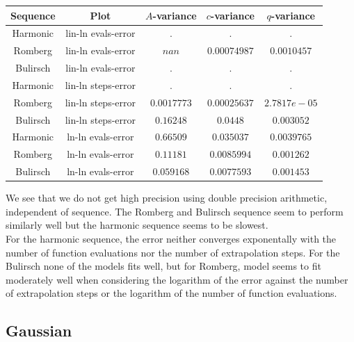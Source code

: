 \begin{table}[H]
    \centering
    \begin{tabular}{c|c||c|c|c}
Sequence & Plot & \(A\)-variance & \(c\)-variance & \(q\)-variance\\\hline
Harmonic & lin-ln evals-error & . & . & . \\
Romberg & lin-ln evals-error & \(nan\) & \(0.00074987\) & \(0.0010457\) \\
Bulirsch & lin-ln evals-error & . & . & . \\
Harmonic & lin-ln steps-error & . & . & . \\
Romberg & lin-ln steps-error & \(0.0017773\) & \(0.00025637\) & \(2.7817e-05\) \\
Bulirsch & lin-ln steps-error & \(0.16248\) & \(0.0448\) & \(0.003052\) \\
Harmonic & ln-ln evals-error & \(0.66509\) & \(0.035037\) & \(0.0039765\) \\
Romberg & ln-ln evals-error & \(0.11181\) & \(0.0085994\) & \(0.001262\) \\
Bulirsch & ln-ln evals-error & \(0.059168\) & \(0.0077593\) & \(0.001453\) \\
    \end{tabular}
    \label{tab:my_label}
\end{table}

We see that we do not get high precision using double precision arithmetic, independent of sequence. The Romberg and Bulirsch sequence seem to perform similarly well but the harmonic sequence seems to be slowest.\\

For the harmonic sequence, the error neither converges exponentally with the number of function evaluations nor the number of extrapolation steps. For the Bulirsch none of the models fits well, but for Romberg, model seems to fit moderately well when considering the logarithm of the error against the number of extrapolation steps or the logarithm of the number of function evaluations.

\subsection{Gaussian}

